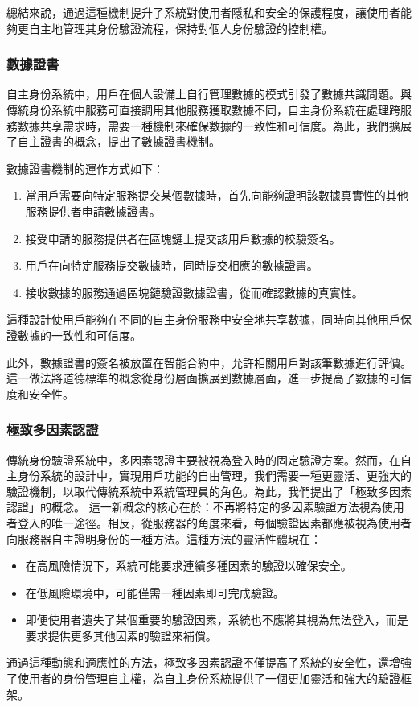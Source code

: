 總結來說，通過這種機制提升了系統對使用者隱私和安全的保護程度，讓使用者能夠更自主地管理其身份驗證流程，保持對個人身份驗證的控制權。
\subsubsection{數據證書}
自主身份系統中，用戶在個人設備上自行管理數據的模式引發了數據共識問題。與傳統身份系統中服務可直接調用其他服務獲取數據不同，自主身份系統在處理跨服務數據共享需求時，需要一種機制來確保數據的一致性和可信度。為此，我們擴展了自主證書的概念，提出了數據證書機制。

數據證書機制的運作方式如下：
\begin{enumerate}
  \item 當用戶需要向特定服務提交某個數據時，首先向能夠證明該數據真實性的其他服務提供者申請數據證書。
  \item 接受申請的服務提供者在區塊鏈上提交該用戶數據的校驗簽名。
  \item 用戶在向特定服務提交數據時，同時提交相應的數據證書。
  \item 接收數據的服務通過區塊鏈驗證數據證書，從而確認數據的真實性。
\end{enumerate}
這種設計使用戶能夠在不同的自主身份服務中安全地共享數據，同時向其他用戶保證數據的一致性和可信度。

此外，數據證書的簽名被放置在智能合約中，允許相關用戶對該筆數據進行評價。這一做法將道德標準的概念從身份層面擴展到數據層面，進一步提高了數據的可信度和安全性。
\subsubsection{極致多因素認證}
傳統身份驗證系統中，多因素認證主要被視為登入時的固定驗證方案。然而，在自主身份系統的設計中，實現用戶功能的自由管理，我們需要一種更靈活、更強大的驗證機制，以取代傳統系統中系統管理員的角色。為此，我們提出了「極致多因素認證」的概念。
這一新概念的核心在於：不再將特定的多因素驗證方法視為使用者登入的唯一途徑。相反，從服務器的角度來看，每個驗證因素都應被視為使用者向服務器自主證明身份的一種方法。這種方法的靈活性體現在：
\begin{itemize}
  \item 在高風險情況下，系統可能要求連續多種因素的驗證以確保安全。
  \item 在低風險環境中，可能僅需一種因素即可完成驗證。
  \item 即便使用者遺失了某個重要的驗證因素，系統也不應將其視為無法登入，而是要求提供更多其他因素的驗證來補償。
\end{itemize}
通過這種動態和適應性的方法，極致多因素認證不僅提高了系統的安全性，還增強了使用者的身份管理自主權，為自主身份系統提供了一個更加靈活和強大的驗證框架。
